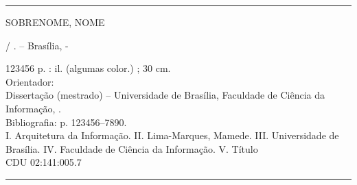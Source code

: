 %
%

\thispagestyle{empty}
{
\vspace*{15cm}					%
\footnotesize					%
\hrule							%
\begin{center}					%
\begin{minipage}[c]{12.5cm}		%
\begin{spacing}{1.0}				%

SOBRENOME, NOME

\hspace{0.5cm} \meutituloLinhaUnica  / \autores. --
Brasília, \dataAno-

\hspace{0.5cm} 123456 p. : il. (algumas color.) ; 30 cm.
\\

\hspace{0.5cm} Orientador: \nomeOrientador
\\

\hspace{0.5cm} Dissertação (mestrado) -- Universidade de Brasília, Faculdade de
Ciência da Informação, \dataAno.
\\

\hspace{0.5cm} Bibliografia: p. 123456--7890.
\\

\hspace{0.5cm} 
	I. Arquitetura da Informação. 
	II. Lima-Marques, Mamede. 
	III. Universidade de	Brasília. 
	IV. Faculdade de Ciência da Informação. 
	V. Título 			%
\\

\hspace{8.75cm} CDU 02:141:005.7
\\

\end{spacing}
\end{minipage}
\end{center}
\hrule
}